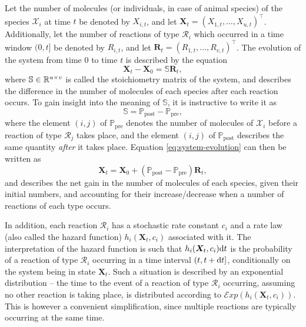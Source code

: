 Let the number of molecules (or individuals, in case of animal species) of the species $\mathcal{X}_i$ at time $t$ be denoted by $X_{i,t}$, and let $\bm{X}_t = \left(X_{1,t}, \ldots, X_{u,t}\right)^\intercal$. Additionally, let the number of reactions of type $\mathcal{R}_i$ which occurred in a time window $(0, t]$ be denoted by $R_{i,t}$, and let $\bm{R}_t = \left(R_{1,t}, \ldots,R_{v,t}\right)^\intercal$. The evolution of the system from time 0 to time $t$ is described by the equation
\begin{equation} \label{eq:system-evolution}
\bm{X}_t - \bm{X}_0 = \mathbb{S}\bm{R}_t,
\end{equation}
where $\mathbb{S} \in \mathbb{R}^{u \times v}$ is called the stoichiometry matrix of the system, and describes the difference in the number of molecules of each species after each reaction occurs. To gain insight into the meaning of $\mathbb{S}$, it is instructive to write it as
\begin{equation*}
\mathbb{S} = \mathbb{P}_\text{post} - \mathbb{P}_\text{pre},
\end{equation*}
where the element $(i,j)$ of $\mathbb{P}_\text{pre}$ denotes the number of molecules of $\mathcal{X}_i$ before a reaction of type $\mathcal{R}_j$ takes place, and the element $(i,j)$ of $\mathbb{P}_\text{post}$ describes the same quantity \emph{after} it takes place. Equation \eqref{eq:system-evolution} can then be written as
\begin{equation*}
\bm{X}_t = \bm{X}_0 + \left(\mathbb{P}_\text{post} - \mathbb{P}_\text{pre}\right) \bm{R}_t,
\end{equation*}
and describes the net gain in the number of molecules of each species, given their initial numbers, and accounting for their increase/decrease when a number of reactions of each type occurs.

In addition, each reaction $\mathcal{R}_i$ has a stochastic rate constant $c_i$ and a rate law (also called the hazard function) $h_i(\bm{X}_t, c_i)$ associated with it. The interpretation of the hazard function is such that $h_i(\bm{X}_t, c_i) \mathrm{d}{t}$ is the probability of a reaction of type $\mathcal{R}_i$ occurring in a time interval $(t, t + \mathrm{d}{t}]$, conditionally on the system being in state $\bm{X}_t$. Such a situation is described by an exponential distribution -- the time to the event of a reaction of type $\mathcal{R}_i$ occurring, assuming no other reaction is taking place, is distributed according to ${\mathcal{E}\mathit{xp}\left(h_i(\bm{X}_t, c_i)\right)}$. This is however a convenient simplification, since multiple reactions are typically occurring at the same time.

